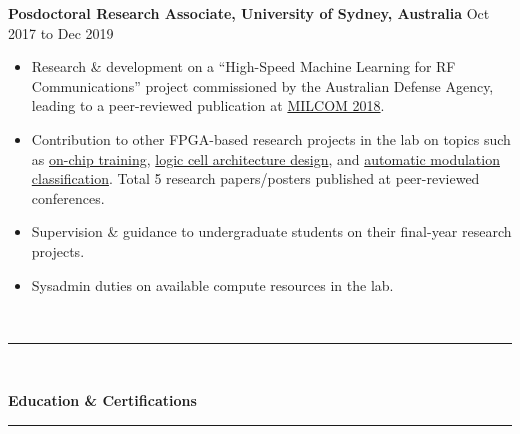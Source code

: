 \documentclass[10pt]{article}
\newenvironment{myinnerlist}[1][\enskip\textbullet]%
        {\begin{itemize}[#1,leftmargin=*,parsep=0pt,itemsep=3pt,topsep=0pt,partopsep=0pt]}
        {\end{itemize}\vspace{.6\baselineskip}}
\newcommand{\localtextbulletone}{\textcolor{gray}{\raisebox{.45ex}{\rule{.8ex}{.8ex}}}}
\begin{document}
{\begin{minipage}[t]{\textwidth+\marginparwidth+\marginparsep}
\begin{myinnerlist}
        \end{myinnerlist}

        \textbf{Posdoctoral Research Associate, University of Sydney, Australia} \hfill {Oct 2017 to Dec 2019}

        \vspace{0.1in}
        \begin{myinnerlist}
            \renewcommand{\labelitemi}{\localtextbulletone}

            \item Research \& development on a ``High-Speed Machine Learning
                for RF Communications'' project commissioned by the Australian
                Defense Agency, leading to a peer-reviewed publication at
                \href{https://ieeexplore.ieee.org/document/8599833}{MILCOM
                2018}.
            \item Contribution to other FPGA-based research projects in the lab on
                topics such as
                \href{https://ieeexplore.ieee.org/document/8742277}{on-chip
                training},
                \href{https://dl.acm.org/doi/abs/10.1145/3373087.3375303}{logic
                cell architecture design}, and
                \href{https://ieeexplore.ieee.org/abstract/document/9150443}{automatic
                modulation classification}. Total 5 research papers/posters
                published at peer-reviewed conferences.
            \item Supervision \& guidance to undergraduate students on their
                final-year research projects.
            \item Sysadmin duties on available compute resources in the lab.

        \end{myinnerlist}
        \vspace{-0.15in}
    \end{minipage}
}\\[.15\baselineskip]

{
    \hspace*{-\marginparsep minus \marginparwidth}%
    \begin{minipage}[t]{\textwidth+\marginparwidth+\marginparsep}%
         \rule{\columnwidth}{1pt}\\[-1.4\baselineskip]%
         \begin{center}{\large \bfseries Education \& Certifications}\end{center}
         \vspace{-0.18in}
         \rule{\columnwidth}{1pt}\\[-1.4\baselineskip]%
     \end{minipage}}\\[.5\baselineskip]
\end{document}
